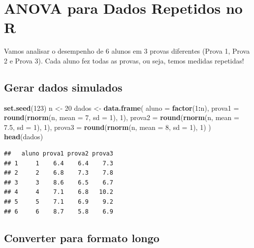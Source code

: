 \documentclass[
]{book}
\newenvironment{Shaded}{\begin{snugshade}}{\end{snugshade}}
\newcommand{\AttributeTok}[1]{\textcolor[rgb]{0.13,0.29,0.53}{#1}}
\newcommand{\DecValTok}[1]{\textcolor[rgb]{0.00,0.00,0.81}{#1}}
\newcommand{\FloatTok}[1]{\textcolor[rgb]{0.00,0.00,0.81}{#1}}
\newcommand{\FunctionTok}[1]{\textcolor[rgb]{0.13,0.29,0.53}{\textbf{#1}}}
\newcommand{\NormalTok}[1]{#1}
\newcommand{\OtherTok}[1]{\textcolor[rgb]{0.56,0.35,0.01}{#1}}
\newcommand{\SpecialCharTok}[1]{\textcolor[rgb]{0.81,0.36,0.00}{\textbf{#1}}}
\begin{document}
\section{ANOVA para Dados Repetidos no R}\label{anova-para-dados-repetidos-no-r}

Vamos analisar o desempenho de 6 alunos em 3 provas diferentes (Prova 1, Prova 2 e Prova 3). Cada aluno fez todas as provas, ou seja, temos medidas repetidas!

\subsection{Gerar dados simulados}\label{gerar-dados-simulados}

\begin{Shaded}
\begin{Highlighting}[]
\FunctionTok{set.seed}\NormalTok{(}\DecValTok{123}\NormalTok{)}
\NormalTok{n }\OtherTok{\textless{}{-}} \DecValTok{20}
\NormalTok{dados }\OtherTok{\textless{}{-}} \FunctionTok{data.frame}\NormalTok{(}
  \AttributeTok{aluno =} \FunctionTok{factor}\NormalTok{(}\DecValTok{1}\SpecialCharTok{:}\NormalTok{n),}
  \AttributeTok{prova1 =} \FunctionTok{round}\NormalTok{(}\FunctionTok{rnorm}\NormalTok{(n, }\AttributeTok{mean =} \DecValTok{7}\NormalTok{, }\AttributeTok{sd =} \DecValTok{1}\NormalTok{), }\DecValTok{1}\NormalTok{),}
  \AttributeTok{prova2 =} \FunctionTok{round}\NormalTok{(}\FunctionTok{rnorm}\NormalTok{(n, }\AttributeTok{mean =} \FloatTok{7.5}\NormalTok{, }\AttributeTok{sd =} \DecValTok{1}\NormalTok{), }\DecValTok{1}\NormalTok{),}
  \AttributeTok{prova3 =} \FunctionTok{round}\NormalTok{(}\FunctionTok{rnorm}\NormalTok{(n, }\AttributeTok{mean =} \DecValTok{8}\NormalTok{, }\AttributeTok{sd =} \DecValTok{1}\NormalTok{), }\DecValTok{1}\NormalTok{)}
\NormalTok{)}
\FunctionTok{head}\NormalTok{(dados)}
\end{Highlighting}
\end{Shaded}

\begin{verbatim}
##   aluno prova1 prova2 prova3
## 1     1    6.4    6.4    7.3
## 2     2    6.8    7.3    7.8
## 3     3    8.6    6.5    6.7
## 4     4    7.1    6.8   10.2
## 5     5    7.1    6.9    9.2
## 6     6    8.7    5.8    6.9
\end{verbatim}

\subsection{Converter para formato longo}\label{converter-para-formato-longo}
\end{document}
